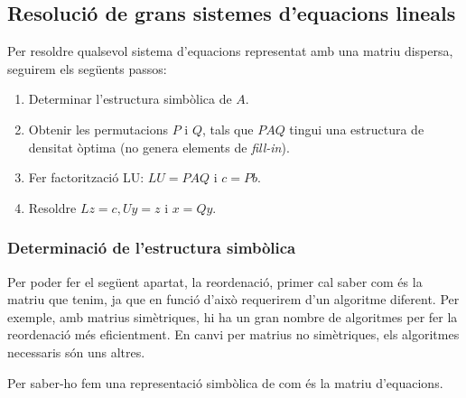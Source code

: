 \documentclass[8pt]{beamer}
\begin{document}
\subsection{Resolució de grans sistemes d'equacions lineals}
\begin{frame}
  Per resoldre qualsevol sistema d'equacions representat amb una matriu dispersa, seguirem els següents passos:

\begin{enumerate}
	\item Determinar l'estructura simbòlica de $A$.
	\item Obtenir les permutacions $P$ i $Q$, tals que $PAQ$ tingui una estructura de densitat òptima (no genera elements de \textit{fill-in}).
	\item Fer factorització LU: $LU = PAQ$ i $c = Pb$.
	\item Resoldre $Lz = c, Uy = z$ i $x=Qy$.
\end{enumerate}  
\end{frame}

\begin{frame}
\frametitle{Determinació de l'estructura simbòlica}
Per poder fer el següent apartat, la reordenació, primer cal saber com és la matriu que tenim, ja que en funció d'això requerirem d'un algoritme diferent. Per exemple, amb matrius simètriques, hi ha un gran nombre de algoritmes per fer la reordenació més eficientment. En canvi per matrius no simètriques, els algoritmes necessaris són uns altres.

Per saber-ho fem una representació simbòlica de com és la matriu d'equacions.

\end{frame}
\end{document}
